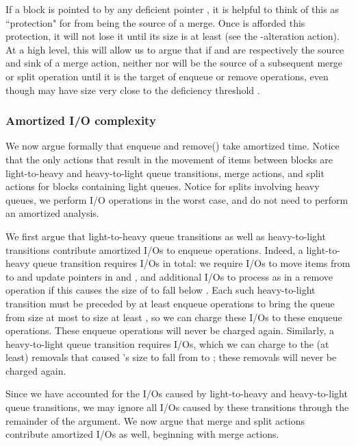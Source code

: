 \documentclass[11pt,letterpaper]{article}
\newcommand{\eat}[1]{}
\begin{document}
If a block  is pointed to by any deficient pointer , it is helpful to think of this 
as ``protection" for  from being the source of a merge. Once  is afforded this protection,
it will not lose it until its size is at least  (see the -alteration action).
At a high level, this will allow us to argue that if  and  are respectively 
the source and sink of a merge action,
neither  nor  will be the source of a subsequent merge or split operation until it is the target of  enqueue
or remove operations, even though  may have size very close to the deficiency threshold . 

\subsubsection{Amortized I/O complexity}
\label{sec:amort}
\eat{In total this costs  I/Os, but we can charge these,
in an amortized sense, to the 
enqueue operations that caused 
 to grow from size at most  to at least .
(These enqueue operations will never be charged in this way again.)}

We now argue formally that enqueue and remove() take  amortized time. Notice that the only actions that result in the movement of items between blocks are light-to-heavy and heavy-to-light queue transitions, merge actions, and split actions for blocks containing light queues. Notice for splits involving heavy queues, we perform  I/O operations 
in the worst case,
and do not need to perform an amortized analysis.  

We first argue that light-to-heavy queue transitions as well as heavy-to-light transitions contribute  amortized I/Os to enqueue operations. Indeed, a light-to-heavy queue transition
requires  I/Os in total: we require  I/Os to move  items from  to  and update pointers in  and , and  additional I/Os to process  as in a remove operation if this causes the size of  to fall below . Each such heavy-to-light transition
must be preceded by at least  enqueue operations to bring the queue from size at most  to size at least , so we can charge these  I/Os to these enqueue operations. These enqueue operations will never be charged again. Similarly, a heavy-to-light queue transition requires  I/Os, which we can charge to the (at least)  removals that caused 's size
to fall from  to ; these removals will never be charged again.

Since we have accounted for the I/Os caused by light-to-heavy and heavy-to-light queue transitions, we may ignore all I/Os caused by
these transitions through the remainder of the argument.
We now argue that merge and split actions contribute  amortized I/Os as well, beginning with merge actions.
\end{document}

